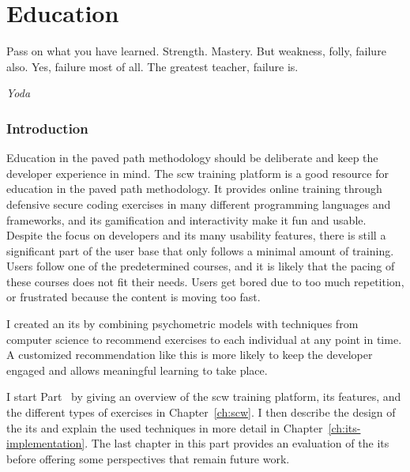 \part{Education}
\label{p:education}
\epigraph{Pass on what you have learned. Strength. Mastery. But weakness, folly, failure also. Yes, failure most of all. The greatest teacher, failure is.}{\textit{Yoda}}

\clearpage
\section*{Introduction}
Education in the paved path methodology should be deliberate and keep the developer experience in mind.
The \gls{scw} training platform is a good resource for education in the paved path methodology. 
It provides online training through defensive secure coding exercises in many different programming languages and frameworks, and its gamification and interactivity make it fun and usable.
%
Despite the focus on developers and its many usability features, there is still a significant part of the user base that only follows a minimal amount of training.
Users follow one of the predetermined courses, and it is likely that the pacing of these courses does not fit their needs.
Users get bored due to too much repetition, or frustrated because the content is moving too fast.

I created an \gls{its} by combining psychometric models with techniques from computer science to recommend exercises to each individual at any point in time. 
A customized recommendation like this is more likely to keep the developer engaged and allows meaningful learning to take place.

I start Part~\ref{p:education} by giving an overview of the \gls{scw} training platform, its features, and the different types of exercises in Chapter~\ref{ch:scw}.
I then describe the design of the \gls{its} and explain the used techniques in more detail in Chapter~\ref{ch:its-implementation}.
The last chapter in this part provides an evaluation of the \gls{its} before offering some perspectives that remain future work.

